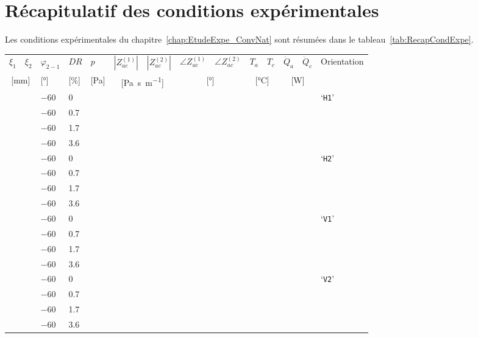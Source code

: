\chapter{Récapitulatif des conditions expérimentales}
Les conditions expérimentales du chapitre~\ref{chap:EtudeExpe_ConvNat} sont résumées dans le tableau~\ref{tab:RecapCondExpe}.

\begin{table}[!ht]
\centering
	\begin{tabular}{ llll llll llll ll}
	\hline
	$\xi_1$ & $\xi_2$ & $\varphi_{2-1}$  & $DR$ & $p$ & $|Z_{ac}^{(1)}|$ & $|Z_{ac}^{(2)}|$& $\angle Z_{ac}^{(1)}$  & $\angle Z_{ac}^{(2)}$ & $T_a$  & $T_c$ & $\dot Q_a$ & $\dot Q_c$  & \multirow{2}{*}{Orientation} \\%
	
	\multicolumn{2}{c}{[\unit{\milli\meter}]} & [\unit{\degree}] & [\unit{\percent}] & [\unit{\pascal}] & \multicolumn{2}{c}{[\unit{\pascal\second\per\meter}]} & \multicolumn{2}{c}{[\unit{\degree}]}  & \multicolumn{2}{c}{[\unit{\degreeCelsius}]} &\multicolumn{2}{c}{[\unit{\watt}]} &  \\\hline\hline
	 &  & \num{-60} & \num{0} & && & & &  & \num{} & & & \multirow{4}{*}{`\texttt{H1}'} \\
	 &  & \num{-60} & \num{.7} & && & & &  & \num{} & & &  \\
	 &  & \num{-60} & \num{1.7} & & &&&  &  & \num{} & & & \\
	 &  & \num{-60} & \num{3.6} & & & &&&  & \num{} & & &  \\	 
	 &  & \num{-60} & \num{0} & && & & &  & \num{} & & & \multirow{4}{*}{`\texttt{H2}'} \\
	 &  & \num{-60} & \num{.7} & & & &&& & \num{} & & & \\
	 &  & \num{-60} & \num{1.7} & & &&& & & \num{} & & & \\
	 &  & \num{-60} & \num{3.6} & & & &&& & \num{} & & & \\
	 &  & \num{-60} & \num{0} & && & & &  & \num{} & & & \multirow{4}{*}{`\texttt{V1}'} \\
	 &  & \num{-60} & \num{.7} & & & & &&& \num{} & & & \\
	 &  & \num{-60} & \num{1.7} &  & & &&& & \num{} & & & \\
	 &  & \num{-60} & \num{3.6} &  & & &&& & \num{} & & & \\
	 &  & \num{-60} & \num{0} & && & & &  & \num{} & & & \multirow{4}{*}{`\texttt{V2}'} \\
	 &  & \num{-60} & \num{.7} & & && & && \num{} & & & \\
	 &  & \num{-60} & \num{1.7} & & & &&& & \num{} & & & \\
	 &  & \num{-60} & \num{3.6} &  & & & & \num{} & & & \\
	 \hline
	

\end{tabular}
\end{table}
